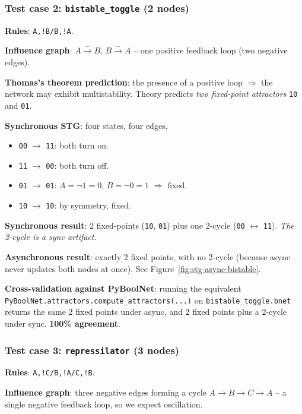 \documentclass[oneside,final]{hcmut-report}
\begin{document}
\subsubsection{Test case 2: \texttt{bistable\_toggle} (2 nodes)}

\textbf{Rules}: \texttt{A,!B/B,!A}.

\textbf{Influence graph}: $A \xrightarrow{-} B$, $B \xrightarrow{-} A$ -- one positive feedback loop (two negative edges).

\textbf{Thomas's theorem prediction}: the presence of a positive loop $\Rightarrow$ the network may exhibit multistability. Theory predicts \textit{two fixed-point attractors} \texttt{10} and \texttt{01}.

\textbf{Synchronous STG}: four states, four edges.
\begin{itemize}[leftmargin=*]
    \item \texttt{00} $\to$ \texttt{11}: both turn on.
    \item \texttt{11} $\to$ \texttt{00}: both turn off.
    \item \texttt{01} $\to$ \texttt{01}: $A = \lnot 1 = 0$, $B = \lnot 0 = 1$ $\Rightarrow$ fixed.
    \item \texttt{10} $\to$ \texttt{10}: by symmetry, fixed.
\end{itemize}

\textbf{Synchronous result}: 2 fixed-points (\texttt{10}, \texttt{01}) plus one 2-cycle (\texttt{00} $\leftrightarrow$ \texttt{11}). \textit{The 2-cycle is a sync artifact}.

\textbf{Asynchronous result}: exactly 2 fixed points, with no 2-cycle (because async never updates both nodes at once). See Figure~\ref{fig:stg-async-bistable}.

\textbf{Cross-validation against PyBoolNet}: running the equivalent \texttt{PyBoolNet.attractors.compute\_attractors(...)} on \texttt{bistable\_toggle.bnet} returns the same 2 fixed points under async, and 2 fixed points plus a 2-cycle under sync. \textbf{100\% agreement}.

\subsubsection{Test case 3: \texttt{repressilator} (3 nodes)}

\textbf{Rules}: \texttt{A,!C/B,!A/C,!B}.

\textbf{Influence graph}: three negative edges forming a cycle $A \to B \to C \to A$ -- a single negative feedback loop, so we expect oscillation.
\end{document}
